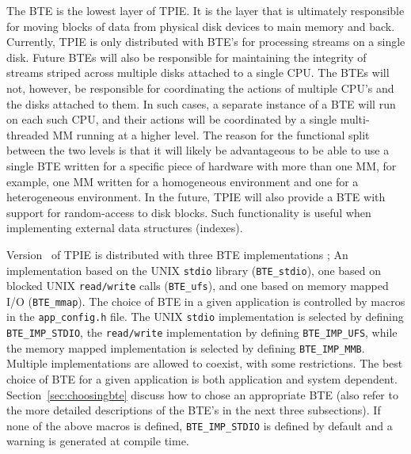 The BTE is the lowest layer of TPIE. It is the layer that is
ultimately responsible for moving blocks of data from physical disk devices
to main memory and back.
Currently, TPIE is only distributed with BTE's for processing streams on a
single disk. Future BTEs will also be responsible for maintaining the
integrity of streams striped across multiple disks attached to a single
CPU. The BTEs will not, however, be responsible for coordinating the
actions of multiple CPU's and the disks attached to them. In such cases, a
separate instance of a BTE will run on each such CPU, and their actions
will be coordinated by a single multi-threaded MM running at a higher
level. The reason for the functional split between the two levels is that
it will likely be advantageous to be able to use a single BTE written for a
specific piece of hardware with more than one MM, for example, one MM
written for a homogeneous environment and one for a heterogeneous
environment. In the future, TPIE will also provide a BTE with support for
random-access to disk blocks. Such functionality is useful when
implementing external data structures (indexes).

Version \version~of TPIE is distributed with three BTE implementations ; An
implementation based on the UNIX \verb|stdio| library (\verb|BTE_stdio|),
one based on blocked UNIX {\tt read/write} calls 
(\verb|BTE_ufs|), and one based on memory mapped I/O (\verb|BTE_mmap|). The
choice of BTE in a given application is controlled by macros in the
\verb|app_config.h| file.  The UNIX \verb|stdio| implementation is selected
by defining \verb|BTE_IMP_STDIO|, the \verb|read/write| implementation by
defining \verb|BTE_IMP_UFS|, while the memory mapped implementation is
selected by defining \verb|BTE_IMP_MMB|. Multiple implementations are
allowed to coexist, with some restrictions. The best choice of BTE for a given application is both
application and system dependent. Section~\ref{sec:choosingbte} discuss how
to chose an appropriate BTE (also refer to the more detailed descriptions
of the BTE's in the next three subsections). If none of the above macros is
defined, \verb|BTE_IMP_STDIO| is defined by default and a warning is
generated at compile time.

